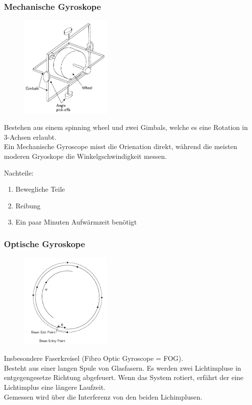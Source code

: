 \documentclass[10pt,a4paper,oneside]{beamer}
\begin{document}
\begin{frame}
\frametitle{Mechanische Gyroskope}
\begin{figure}
\includegraphics[width=0.4\textwidth]{images/mechanical_gyroscope.png} 
\end{figure}

Bestehen aus einem spinning wheel und zwei Gimbals, welche es eine Rotation in 3-Achsen erlaubt. \\
Ein Mechanische Gyroscope misst die Orienation direkt, während die meisten moderen Gryoskope die Winkelgschwindigkeit messen.

Nachteile:
\begin{enumerate}
  	\item Bewegliche Teile
  	\item Reibung
  	\item Ein paar Minuten Aufwärmzeit benötigt
  \end{enumerate}

\end{frame}


\begin{frame}
\frametitle{Optische Gyroskope}
\begin{figure}
\includegraphics[width=0.4\textwidth]{images/fog.png} 
\end{figure}

Insbesondere Faserkreisel (Fibro Optic Gyroscope = FOG). \\
Besteht aus einer langen Spule von Glasfasern. Es werden zwei Lichtimpluse in entgegengesetze Richtung abgefeuert. Wenn das System rotiert, erfährt der eine Lichtimplus eine längere Laufzeit.\\
Gemessen wird über die Interferenz von den beiden Lichimplusen.

\end{frame}
\end{document}

